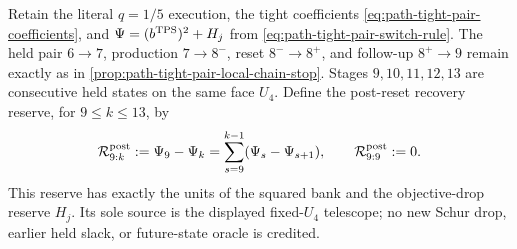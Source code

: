 \begin{proposition}
\label{prop:path-tight-pair-recovery-block}
Retain the literal $q=1/5$ execution, the tight coefficients
\cref{eq:path-tight-pair-coefficients}, and
$\Psi=(b^{\rm TPS})^2+H_j$ from
\cref{eq:path-tight-pair-switch-rule}.  The held pair $6\to7$, production
$7\to8^-$, reset $8^-\to8^+$, and follow-up $8^+\to9$ remain exactly as in
\cref{prop:path-tight-pair-local-chain-stop}.  Stages $9,10,11,12,13$ are
consecutive held states on the same face $U_4$.  Define the post-reset
recovery reserve, for $9\leq k\leq13$, by
\begin{equation}
 \mathcal R_{9:k}^{\rm post}
 :=\Psi_9-\Psi_k
 =\sum_{s=9}^{k-1}(\Psi_s-\Psi_{s+1}),
 \qquad \mathcal R_{9:9}^{\rm post}:=0.
 \label{eq:path-tight-pair-recovery-reserve}
\end{equation}
This reserve has exactly the units of the squared bank and the objective-drop
reserve $H_j$.  Its sole source is the displayed fixed-$U_4$ telescope; no
new Schur drop, earlier held slack, or future-state oracle is credited.


\end{proposition}
